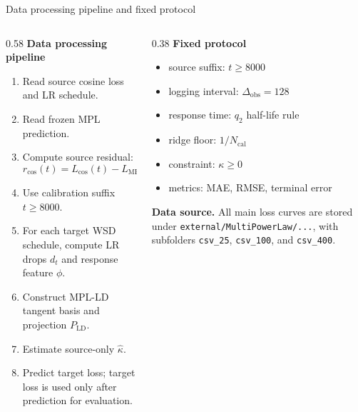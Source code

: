 \documentclass[9pt,aspectratio=169,fontset=fandol]{ctexbeamer}
\newcommand{\code}[1]{\texttt{\small #1}}
\newcommand{\tightlist}{\setlength{\itemsep}{2pt}\setlength{\parskip}{0pt}}
\begin{document}
\begin{frame}{Data processing pipeline and fixed protocol}
\small
\begin{columns}[T]
\begin{column}{0.58\textwidth}
\textbf{Data processing pipeline}
\begin{enumerate}\tightlist
\item Read source cosine loss and LR schedule.
\item Read frozen MPL prediction.
\item Compute source residual:
\[
r_{\cos}(t)=L_{\cos}(t)-L_{\mathrm{MPL},\cos}(t).
\]
\item Use calibration suffix \(t\ge8000\).
\item For each target WSD schedule, compute LR drops \(d_t\) and response feature \(\phi\).
\item Construct MPL-LD tangent basis and projection \(P_{\mathrm{LD}}\).
\item Estimate source-only \(\widehat\kappa\).
\item Predict target loss; target loss is used only after prediction for evaluation.
\end{enumerate}
\end{column}
\begin{column}{0.38\textwidth}
\textbf{Fixed protocol}
\begin{itemize}\tightlist
\item source suffix: \(t\ge8000\)
\item logging interval: \(\Delta_{\mathrm{obs}}=128\)
\item response time: \(q_2\) half-life rule
\item ridge floor: \(1/N_{\mathrm{cal}}\)
\item constraint: \(\kappa\ge0\)
\item metrics: MAE, RMSE, terminal error
\end{itemize}
\vfill
\textbf{Data source.}
All main loss curves are stored under
\code{external/MultiPowerLaw/...}, with subfolders
\code{csv\_25}, \code{csv\_100}, and \code{csv\_400}.
\end{column}
\end{columns}
\end{frame}
\end{document}
